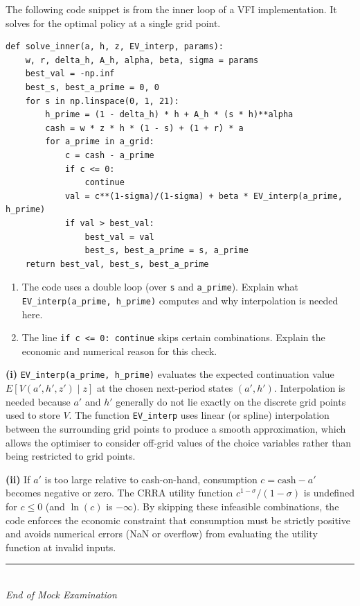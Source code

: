 \documentclass[11pt,a4paper]{article}
\begin{document}
The following code snippet is from the inner loop of a VFI implementation.  It solves for the optimal policy at a single grid point.

\begin{lstlisting}
def solve_inner(a, h, z, EV_interp, params):
    w, r, delta_h, A_h, alpha, beta, sigma = params
    best_val = -np.inf
    best_s, best_a_prime = 0, 0
    for s in np.linspace(0, 1, 21):
        h_prime = (1 - delta_h) * h + A_h * (s * h)**alpha
        cash = w * z * h * (1 - s) + (1 + r) * a
        for a_prime in a_grid:
            c = cash - a_prime
            if c <= 0:
                continue
            val = c**(1-sigma)/(1-sigma) + beta * EV_interp(a_prime, h_prime)
            if val > best_val:
                best_val = val
                best_s, best_a_prime = s, a_prime
    return best_val, best_s, best_a_prime
\end{lstlisting}

\begin{enumerate}[label=(\roman*),nosep]
\item The code uses a double loop (over \texttt{s} and \texttt{a\_prime}).  Explain what \texttt{EV\_interp(a\_prime, h\_prime)} computes and why interpolation is needed here.
\item The line \texttt{if c <= 0: continue} skips certain combinations.  Explain the economic and numerical reason for this check.
\end{enumerate}

\begin{solution}
\textbf{(i)} \texttt{EV\_interp(a\_prime, h\_prime)} evaluates the expected continuation value $E[V(a', h', z') \mid z]$ at the chosen next-period states $(a', h')$.  Interpolation is needed because $a'$ and $h'$ generally do not lie exactly on the discrete grid points used to store $V$.  The function \texttt{EV\_interp} uses linear (or spline) interpolation between the surrounding grid points to produce a smooth approximation, which allows the optimiser to consider off-grid values of the choice variables rather than being restricted to grid points.

\medskip

\textbf{(ii)} If $a'$ is too large relative to cash-on-hand, consumption $c = \text{cash} - a'$ becomes negative or zero.  The CRRA utility function $c^{1-\sigma}/(1-\sigma)$ is undefined for $c \le 0$ (and $\ln(c)$ is $-\infty$).  By skipping these infeasible combinations, the code enforces the economic constraint that consumption must be strictly positive and avoids numerical errors (NaN or overflow) from evaluating the utility function at invalid inputs.
\end{solution}


\vfill
\begin{center}
\rule{0.5\textwidth}{0.4pt}\\[4pt]
\textit{End of Mock Examination}
\end{center}
\end{document}
